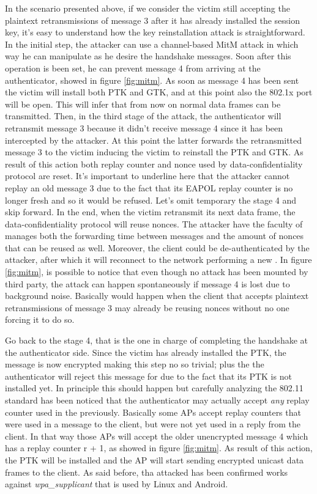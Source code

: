 In the scenario presented above, if we consider the victim still accepting the plaintext retransmissions of message 3 after it has already installed the session key, it's easy to understand how 
the key reinstallation attack is straightforward. In the initial step, the attacker can use a channel-based MitM attack in which way he can manipulate as he desire the handshake messages. Soon after
this operation is been set, he can prevent message 4 from arriving at the authenticator, showed in figure \ref{fig:mitm}.
As soon as message 4 has been sent the victim will install both PTK and GTK, and at this point also the 802.1x port will be open. This will infer that from now on normal data frames can be transmitted.
Then, in the third stage of the attack, the authenticator will retransmit message 3 because it didn't receive message 4 since it has been intercepted by the attacker. At this point the latter forwards the
retransmitted message 3 to the victim inducing the victim to reinstall the PTK and GTK. As result of this action both replay counter and nonce used by data-confidentiality protocol are reset.
It's important to underline here that the attacker cannot replay an old message 3 due to the fact that its EAPOL replay counter is no longer fresh and so it would be refused. Let's omit temporary the stage 4
and skip forward. In the end, when the victim retransmit its next data frame, the data-confidentiality protocol will reuse nonces. The attacker have the faculty of manages both the forwarding time between messages
and the amount of nonces that can be reused as well. Moreover, the client could be de-authenticated by the attacker, after which it will reconnect to the network performing a new \fwh.
In figure \ref{fig:mitm}, is possible to notice that even though no attack has been mounted by third party, the \krack attack can happen spontaneously if message 4 is lost due to background noise.
Basically would happen when the client that accepts plaintext retransmissions of message 3 may already be reusing nonces without no one forcing it to do so. 

Go back to the stage 4, that is the one in charge of completing the handshake at the authenticator side. Since the victim has already installed the PTK, the message is now encrypted making this step no so trivial; plus 
the the authenticator will reject this message for due to the fact that its PTK is not installed yet. In principle this should happen but carefully analyzing the 802.11 standard has been noticed that the authenticator may actually
accept \textit{any} replay counter used in the \fwh previously. Basically some APs accept replay counters that were used in a message to the client, but were not yet used in a reply from the client. In that way those APs will accept
the older unencrypted message 4 which has a replay counter r + 1, as showed in figure \ref{fig:mitm}. As result of this action, the PTK will be installed and the AP will start sending encrypted unicast data frames to the client.
As said before, tha attacked has been confirmed works against \textit{wpa\_supplicant} that is used by Linux and Android.\cite{krk}


